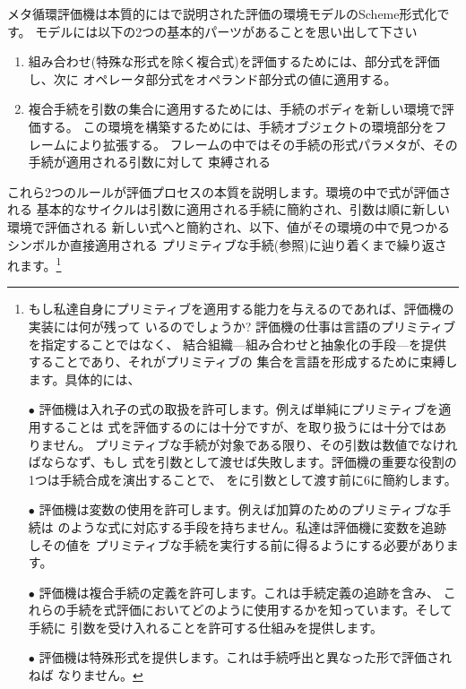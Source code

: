 メタ循環評価機は本質的にはで説明された評価の環境モデルのScheme形式化です。
モデルには以下の2つの基本的パーツがあることを思い出して下さい

\begin{enumerate}

\item
組み合わせ(特殊な形式を除く複合式)を評価するためには、部分式を評価し、次に
オペレータ部分式をオペランド部分式の値に適用する。

\item
複合手続を引数の集合に適用するためには、手続のボディを新しい環境で評価する。
この環境を構築するためには、手続オブジェクトの環境部分をフレームにより拡張する。
フレームの中ではその手続の形式パラメタが、その手続が適用される引数に対して
束縛される
\end{enumerate}

\noindent
これら2つのルールが評価プロセスの本質を説明します。環境の中で式が評価される
基本的なサイクルは引数に適用される手続に簡約され、引数は順に新しい環境で評価される
新しい式へと簡約され、以下、値がその環境の中で見つかるシンボルか直接適用される
プリミティブな手続(参照)に辿り着くまで繰り返されます。\footnote{
もし私達自身にプリミティブを適用する能力を与えるのであれば、評価機の実装には何が残って
いるのでしょうか? 評価機の仕事は言語のプリミティブを指定することではなく、
結合組織---組み合わせと抽象化の手段---を提供することであり、それがプリミティブの
集合を言語を形成するために束縛します。具体的には、



\( \bullet \) 評価機は入れ子の式の取扱を許可します。例えば単純にプリミティブを適用することは
式を評価するのには十分ですが、を取り扱うには十分ではありません。
プリミティブな手続\code{+}が対象である限り、その引数は数値でなければならなず、もし
式を引数として渡せば失敗します。評価機の重要な役割の1つは手続合成を演出することで、
を\code{+}に引数として渡す前に6に簡約します。



\( \bullet \) 評価機は変数の使用を許可します。例えば加算のためのプリミティブな手続は
のような式に対応する手段を持ちません。私達は評価機に変数を追跡しその値を
プリミティブな手続を実行する前に得るようにする必要があります。



\( \bullet \) 評価機は複合手続の定義を許可します。これは手続定義の追跡を含み、
これらの手続を式評価においてどのように使用するかを知っています。そして手続に
引数を受け入れることを許可する仕組みを提供します。


\( \bullet \) 評価機は特殊形式を提供します。これは手続呼出と異なった形で評価されねば
なりません。} 


